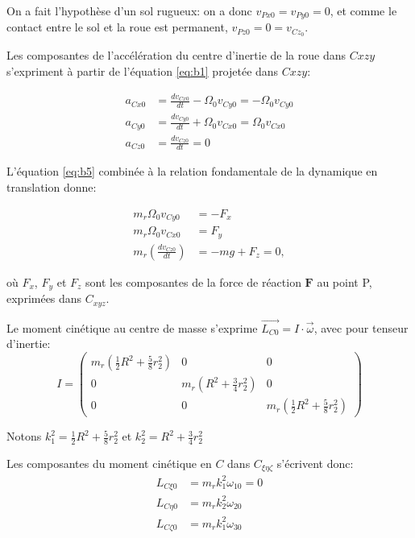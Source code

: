 On a fait l'hypothèse d'un sol rugueux: on a donc $v_{Px0}=v_{Py0}=0$, et comme le contact entre le sol et la roue est permanent, $v_{Pz0}=0=v_{Cz_0}$.


Les composantes de l'accélération du centre d'inertie de la roue dans $C{xzy}$ s'expriment à partir de l'équation \ref{eq:b1} projetée dans $C{xzy}$:

\begin{align}
    a_{Cx0}&=\frac{dv_{Cx0}}{dt}-\Omega_0 v_{Cy0}=-\Omega_0 v_{Cy0} \nonumber\\
    a_{Cy0}&=\frac{dv_{Cy0}}{dt} + \Omega_0 v_{Cx0}=\Omega_0 v_{Cx0}\nonumber\\
    a_{Cz0}&=\frac{dv_{Cz0}}{dt} = 0
  \label{eq:b5}
\end{align}

L'équation \ref{eq:b5} combinée à la relation fondamentale de la dynamique en translation donne:

\begin{align}
    m_r\Omega_0 v_{Cy0}&=-F_x \nonumber\\
    m_r \Omega_0 v_{Cx0}&=F_y \nonumber\\
    m_r(\frac{dv_{Cz0}}{dt})&=-mg+F_z=0,
  \label{eq:b7}
\end{align}

où $F_x$, $F_y$ et $F_z$ sont les composantes de la force de réaction $\mathbf{F}$ au point P, exprimées dans $C_{xyz}$.

Le moment cinétique au centre de masse s'exprime $\vec{L_{C0}}=I \cdot \vec{\omega}$, avec pour tenseur d'inertie:
\begin{equation}
    I=
\begin{pmatrix}
   m_r (\frac{1}{2}R^2+\frac{5}{8}r_2^2) & 0  &  0 \\
  0 &  m_r(R^2+\frac{3}{4}r_2^2) & 0 \\
  0 & 0 & m_r (\frac{1}{2}R^2+\frac{5}{8}r_2^2)
\end{pmatrix}
\label{eq:inertie}
\end{equation}


Notons $k_1^2=\frac{1}{2}R^2+\frac{5}{8}r_2^2$ et $k_2^2=R^2+\frac{3}{4}r_2^2$

Les composantes du moment cinétique en $C$ dans $C_{\xi \eta \zeta}$ s'écrivent donc:
\begin{align}
    L_{C\xi0 }&=m_r k_1^2 \omega_{10}=0 \nonumber\\
    L_{C\eta0}&=m_r k_2^2 \omega_{20} \nonumber\\
    L_{C\zeta0 }&=m_r k_1^2 \omega_{30}
  \label{eq:b6}
\end{align}

